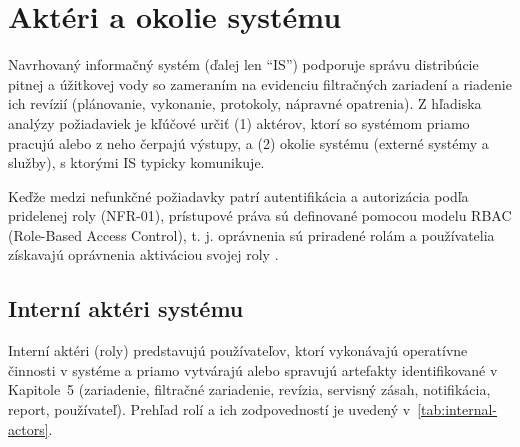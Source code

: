 \section{Aktéri a okolie systému}
\label{sec:akteri-okolie-systemu}

Navrhovaný informačný systém (ďalej len ``IS'') podporuje správu distribúcie pitnej a úžitkovej vody so zameraním na evidenciu filtračných zariadení a riadenie ich revízií (plánovanie, vykonanie, protokoly, nápravné opatrenia). Z hľadiska analýzy požiadaviek je kľúčové určiť (1) aktérov, ktorí so systémom priamo pracujú alebo z neho čerpajú výstupy, a (2) okolie systému (externé systémy a služby), s ktorými IS typicky komunikuje.

Keďže medzi nefunkčné požiadavky patrí autentifikácia a autorizácia podľa pridelenej roly (NFR-01), prístupové práva sú definované pomocou modelu RBAC (Role-Based Access Control), t. j. oprávnenia sú priradené rolám a používatelia získavajú oprávnenia aktiváciou svojej roly \cite{NISTRBACGlossary,NISTRBACProject}.

\subsection{Interní aktéri systému}

Interní aktéri (roly) predstavujú používateľov, ktorí vykonávajú operatívne činnosti v systéme a priamo vytvárajú alebo spravujú artefakty identifikované v Kapitole~5 (zariadenie, filtračné zariadenie, revízia, servisný zásah, notifikácia, report, používateľ).
Prehľad rolí a ich zodpovedností je uvedený v~\autoref{tab:internal-actors}.

